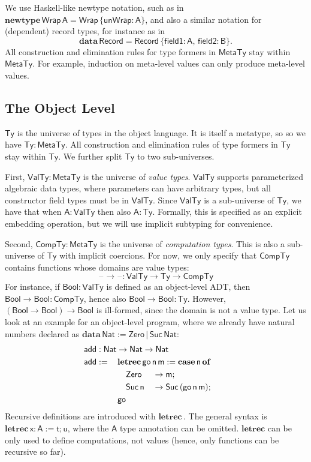 \documentclass[acmsmall,screen,review,anonymous]{acmart}
\newcommand{\mit}[1]{{\mathsf{#1}}}
\newcommand{\msf}[1]{{\mathsf{#1}}}
\newcommand{\mbf}[1]{{\mathbf{#1}}}
\newcommand{\bs}[1]{\boldsymbol{#1}}
\newcommand{\ind}{\hspace{1em}}
\newcommand{\data}{\mbf{data}\,}
\newcommand{\letrec}{\mbf{letrec}\,}
\newcommand{\of}{\mbf{of}\,}
\newcommand{\go}{\mit{go}}
\newcommand{\add}{\mit{add}}
\newcommand{\vm}{\mathsf{m}}
\newcommand{\vn}{\mathsf{n}}
\newcommand{\vA}{\mathsf{A}}
\newcommand{\vB}{\mathsf{B}}
\newcommand{\vx}{\mathsf{x}}
\newcommand{\vt}{\mathsf{t}}
\newcommand{\vu}{\mathsf{u}}
\newcommand{\Bool}{\msf{Bool}}
\newcommand{\case}{\mbf{case\,}}
\newcommand{\MTy}{\msf{MetaTy}}
\newcommand{\VTy}{\msf{ValTy}}
\newcommand{\Ty}{\msf{Ty}}
\newcommand{\CTy}{\msf{CompTy}}
\newcommand{\blank}{{\mathord{\hspace{1pt}\text{--}\hspace{1pt}}}}
\newcommand{\Nat}{\msf{Nat}}
\newcommand{\Zero}{\msf{Zero}}
\newcommand{\Suc}{\msf{Suc}}
\theoremstyle{remark}
\newcommand{\newtype}{\mbf{newtype}\,}
\begin{document}
We use Haskell-like newtype notation, such as in $\newtype \msf{Wrap}\,\vA =
\msf{Wrap}\,\{\mit{unWrap} : \vA \}$, and also a similar notation for (dependent)
record types, for instance as in
\[\data \msf{Record} = \msf{Record}\,\{\mit{field1} : \vA,\,\mit{field2} : \vB\}.\]
All construction and elimination rules for type formers in $\MTy$ stay within
$\MTy$. For example, induction on meta-level values can only produce meta-level
values.

\subsection{The Object Level}\label{sec:the-object-level}

$\bs{\Ty}$ is the universe of types in the object language. It is itself a
metatype, so so we have $\Ty : \MTy$. All construction and elimination rules of
type formers in $\Ty$ stay within $\Ty$. We further split $\Ty$ to two
sub-universes.

First, $\bs{\VTy} : \MTy$ is the universe of \emph{value types}. $\VTy$ supports
parameterized algebraic data types, where parameters can have arbitrary types,
but all constructor field types must be in $\VTy$. Since $\VTy$ is a
sub-universe of $\Ty$, we have that when $\vA : \VTy$ then also $\vA :
\Ty$. Formally, this is specified as an explicit embedding operation, but we
will use implicit subtyping for convenience.

Second, $\bs{\CTy} : \MTy$ is the universe of \emph{computation types}. This is
also a sub-universe of $\Ty$ with implicit coercions. For now, we only specify
that $\CTy$ contains functions whose domains are value types:
\[ \blank\to\blank : \VTy \to \Ty \to \CTy \]
For instance, if $\Bool : \VTy$ is defined as an object-level ADT, then $\Bool
\to \Bool : \CTy$, hence also $\Bool \to \Bool : \Ty$. However, $(\Bool \to
\Bool) \to \Bool$ is ill-formed, since the domain is not a value type. Let us look at an
example for an object-level program, where we already have natural numbers
declared as $\data \Nat := \Zero\,|\,\Suc\,\Nat$:
\begin{alignat*}{3}
  &\hspace{-1em}\rlap{$\add : \Nat \to \Nat \to \Nat$}\\
  &\hspace{-1em}\add :=\,&& \mathrlap{\letrec \go\,\vn\,\vm := \case \vn\,\of}\\
  &\hspace{-1em}         && \ind \Zero     &&\to \vm;\\
  &\hspace{-1em}         && \ind \Suc\,\vn &&\to \Suc\,(\go\,\vn\,\vm);\\
  &\hspace{-1em}         && \go
\end{alignat*}
Recursive definitions are introduced with $\letrec$. The general syntax is
$\letrec \vx : \vA := \vt; \vu$, where the $\vA$ type annotation can be
omitted. $\mbf{letrec}$ can be only used to define computations, not values
(hence, only functions can be recursive so far).
\end{document}
